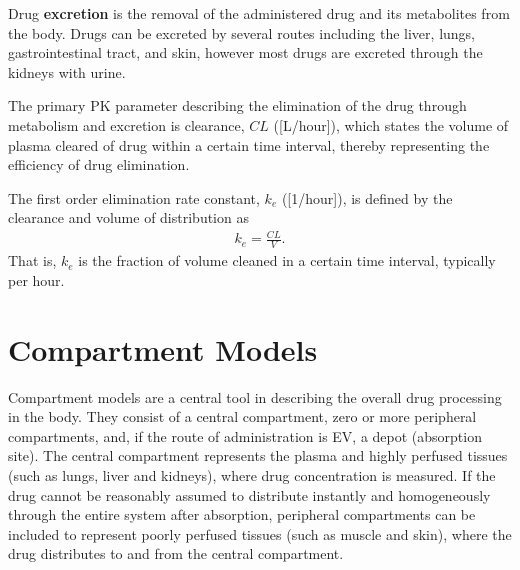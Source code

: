 Drug \textbf{excretion} is the removal of the administered drug and its metabolites from the body. Drugs can be excreted by several routes including the liver, lungs, gastrointestinal tract, and skin, however most drugs are excreted through the kidneys with urine. 

The primary PK parameter describing the elimination of the drug through metabolism and excretion is clearance, $CL$ ([L/hour]), which states the volume of plasma cleared of drug within a certain time interval, thereby representing the efficiency of drug elimination. 

The first order elimination rate constant, $k_e$ ([1/hour]), is defined by the clearance and volume of distribution as 
\begin{align} \label{eq: elimination rate constant}
    k_e = \frac{CL}{V}.
\end{align}
That is, $k_e$ is the fraction of volume cleaned in a certain time interval, typically per hour.


\section{Compartment Models} \label{sec: compartment models}

Compartment models are a central tool in describing the overall drug processing in the body. They consist of a central compartment, zero or more peripheral compartments, and, if the route of administration is EV, a depot (absorption site). The central compartment represents the plasma and highly perfused tissues (such as lungs, liver and kidneys), where drug concentration is measured. If the drug cannot be reasonably assumed to distribute instantly and homogeneously through the entire system after absorption, peripheral compartments can be included to represent poorly perfused tissues (such as muscle and skin), where the drug distributes to and from the central compartment. 



